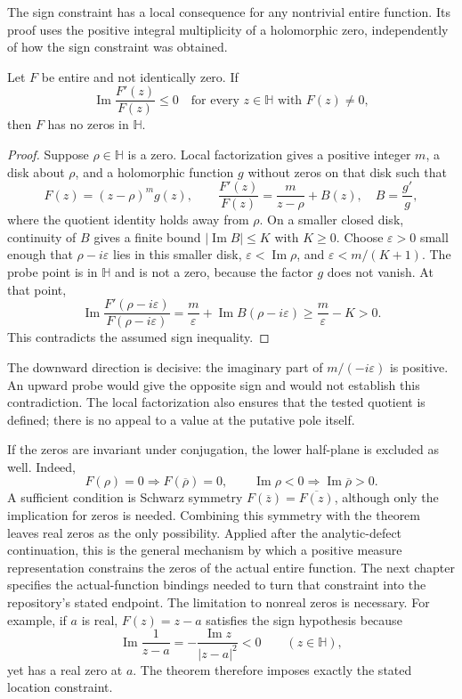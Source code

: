 \label{res:pole-probe}
The sign constraint has a local consequence for any nontrivial entire
function. Its proof uses the positive integral multiplicity of a
holomorphic zero, independently of how the sign constraint was obtained.

\begin{theorem}
Let $F$ be entire and not identically zero. If
\[
 \operatorname{Im}\frac{F'(z)}{F(z)}\le0
 \quad\text{for every }z\in\mathbb H\text{ with }F(z)\ne0,
\]
then $F$ has no zeros in $\mathbb H$.
\end{theorem}
\begin{proof}
Suppose $\rho\in\mathbb H$ is a zero. Local factorization gives a
positive integer $m$, a disk about $\rho$, and a holomorphic function
$g$ without zeros on that disk such that
\[
 F(z)=(z-\rho)^m g(z),\qquad
 \frac{F'(z)}{F(z)}=\frac{m}{z-\rho}+B(z),\quad B=\frac{g'}g,
\]
where the quotient identity holds away from $\rho$. On a smaller
closed disk, continuity of $B$ gives a finite bound
$|\operatorname{Im}B|\le K$ with $K\ge0$. Choose $\varepsilon>0$
small enough that $\rho-i\varepsilon$ lies in this smaller disk,
$\varepsilon<\operatorname{Im}\rho$, and $\varepsilon<m/(K+1)$.
The probe point is in $\mathbb H$ and is not a zero, because the
factor $g$ does not vanish. At that point,
\[
 \operatorname{Im}\frac{F'(\rho-i\varepsilon)}{F(\rho-i\varepsilon)}
 =\frac{m}{\varepsilon}+\operatorname{Im}B(\rho-i\varepsilon)
 \ge\frac{m}{\varepsilon}-K>0.
\]
This contradicts the assumed sign inequality.
\end{proof}

The downward direction is decisive: the imaginary part of
$m/(-i\varepsilon)$ is positive. An upward probe would give the
opposite sign and would not establish this contradiction. The local
factorization also ensures that the tested quotient is defined;
there is no appeal to a value at the putative pole itself.

If the zeros are invariant under conjugation, the lower half-plane
is excluded as well. Indeed,
\[
 F(\rho)=0\Longrightarrow F(\overline\rho)=0,
 \qquad \operatorname{Im}\rho<0
 \Longrightarrow\operatorname{Im}\overline\rho>0.
\]
A sufficient condition is Schwarz symmetry
$F(\overline z)=\overline{F(z)}$, although only the implication for
zeros is needed. Combining this symmetry with the theorem leaves
real zeros as the only possibility. Applied after the analytic-defect
continuation, this is the general mechanism by which a positive
measure representation constrains the zeros of the actual entire
function. The next chapter specifies the actual-function bindings
needed to turn that constraint into the repository's stated endpoint.
The limitation to nonreal zeros is necessary. For example, if $a$ is
real, $F(z)=z-a$ satisfies the sign hypothesis because
\[
 \operatorname{Im}\frac1{z-a}
 =-\frac{\operatorname{Im}z}{|z-a|^2}<0\qquad(z\in\mathbb H),
\]
yet has a real zero at $a$. The theorem therefore imposes exactly
the stated location constraint.
